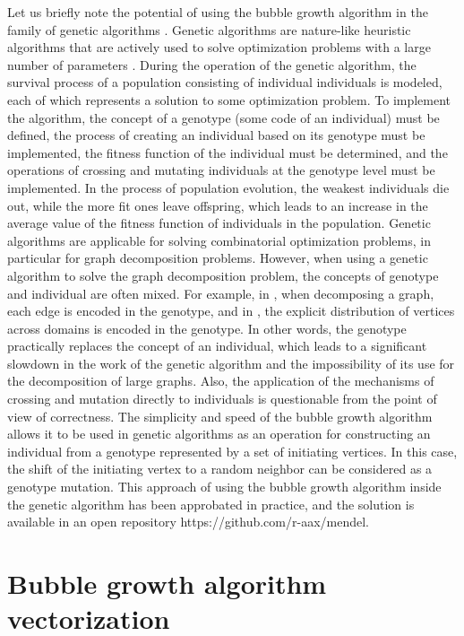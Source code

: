 \documentclass[
11pt,%
tightenlines,%
twoside,%
onecolumn,%
nofloats,%
nobibnotes,%
nofootinbib,%
superscriptaddress,%
noshowpacs,%
centertags]%
{revtex4}
\begin{document}
Let us briefly note the potential of using the bubble growth algorithm in the family of genetic algorithms \cite{20Katosh}.
Genetic algorithms are nature-like heuristic algorithms that are actively used to solve optimization problems with a large number of parameters \cite{21Wirayanti}.
During the operation of the genetic algorithm, the survival process of a population consisting of individual individuals is modeled, each of which represents a solution to some optimization problem.
To implement the algorithm, the concept of a genotype (some code of an individual) must be defined, the process of creating an individual based on its genotype must be implemented, the fitness function of the individual must be determined, and the operations of crossing and mutating individuals at the genotype level must be implemented.
In the process of population evolution, the weakest individuals die out, while the more fit ones leave offspring, which leads to an increase in the average value of the fitness function of individuals in the population.
Genetic algorithms are applicable for solving combinatorial optimization problems, in particular for graph decomposition problems.
However, when using a genetic algorithm to solve the graph decomposition problem, the concepts of genotype and individual are often mixed.
For example, in \cite{22Chaouche}, when decomposing a graph, each edge is encoded in the genotype, and in \cite{23Li}, the explicit distribution of vertices across domains is encoded in the genotype.
In other words, the genotype practically replaces the concept of an individual, which leads to a significant slowdown in the work of the genetic algorithm and the impossibility of its use for the decomposition of large graphs.
Also, the application of the mechanisms of crossing and mutation directly to individuals is questionable from the point of view of correctness.
The simplicity and speed of the bubble growth algorithm allows it to be used in genetic algorithms as an operation for constructing an individual from a genotype represented by a set of initiating vertices.
In this case, the shift of the initiating vertex to a random neighbor can be considered as a genotype mutation.
This approach of using the bubble growth algorithm inside the genetic algorithm has been approbated in practice, and the solution is available in an open repository https://github.com/r-aax/mendel.

\section{Bubble growth algorithm vectorization}
\end{document}
